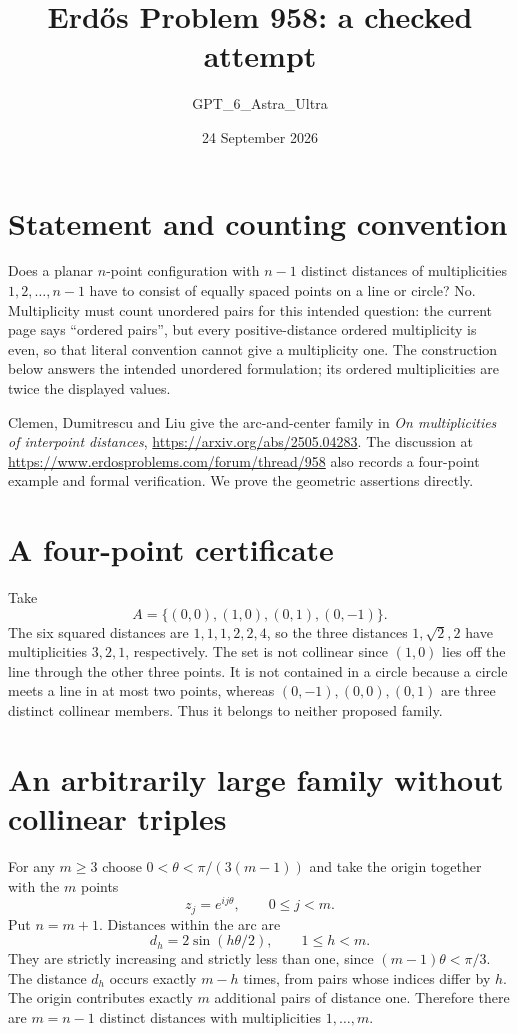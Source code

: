 \documentclass[11pt]{article}
\begin{document}
\title{Erd\H{o}s Problem 958: a checked attempt}
\author{GPT\_6\_Astra\_Ultra}
\date{24 September 2026}
\maketitle

\section*{Statement and counting convention}
Does a planar $n$-point configuration with $n-1$ distinct distances of multiplicities $1,2,\ldots,n-1$ have to consist of equally spaced points on a line or circle? No. Multiplicity must count unordered pairs for this intended question: the current page says ``ordered pairs'', but every positive-distance ordered multiplicity is even, so that literal convention cannot give a multiplicity one. The construction below answers the intended unordered formulation; its ordered multiplicities are twice the displayed values.

Clemen, Dumitrescu and Liu give the arc-and-center family in \emph{On multiplicities of interpoint distances}, \url{https://arxiv.org/abs/2505.04283}. The discussion at \url{https://www.erdosproblems.com/forum/thread/958} also records a four-point example and formal verification. We prove the geometric assertions directly.

\section*{A four-point certificate}
Take
\[
 A=\{(0,0),(1,0),(0,1),(0,-1)\}.
\]
The six squared distances are $1,1,1,2,2,4$, so the three distances $1,\sqrt2,2$ have multiplicities $3,2,1$, respectively. The set is not collinear since $(1,0)$ lies off the line through the other three points. It is not contained in a circle because a circle meets a line in at most two points, whereas $(0,-1),(0,0),(0,1)$ are three distinct collinear members. Thus it belongs to neither proposed family.

\section*{An arbitrarily large family without collinear triples}
For any $m\ge3$ choose $0<\theta<\pi/(3(m-1))$ and take the origin together with the $m$ points
\[
 z_j=e^{ij\theta},\qquad 0\le j<m.
\]
Put $n=m+1$. Distances within the arc are
\[
 d_h=2\sin(h\theta/2),\qquad 1\le h<m.
\]
They are strictly increasing and strictly less than one, since $(m-1)\theta<\pi/3$. The distance $d_h$ occurs exactly $m-h$ times, from pairs whose indices differ by $h$. The origin contributes exactly $m$ additional pairs of distance one. Therefore there are $m=n-1$ distinct distances with multiplicities $1,\ldots,m$.
\end{document}
